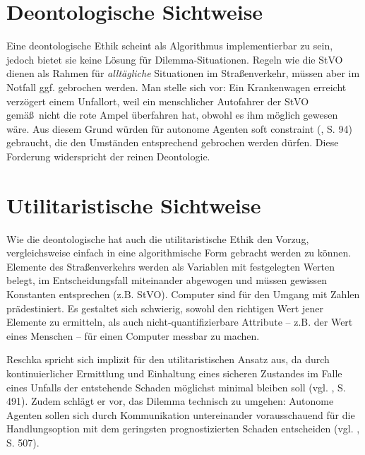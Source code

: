 \documentclass[a4paper, 12pt, titlepage]{scrartcl}
\begin{document}
\section{Deontologische Sichtweise}
	Eine deontologische Ethik scheint als Algorithmus implementierbar zu sein, jedoch bietet sie keine L\"osung f\"ur Dilemma-Situationen. Regeln wie die StVO dienen als Rahmen f\"ur \emph{allt\"agliche} Situationen im Stra\ss enverkehr, m\"ussen aber im Notfall ggf. gebrochen werden. Man stelle sich vor: Ein Krankenwagen erreicht verz\"ogert einem Unfallort, weil ein menschlicher Autofahrer der StVO gem\"a\ss\ nicht die rote Ampel \"uberfahren hat, obwohl es ihm m\"oglich gewesen w\"are. Aus diesem Grund w\"urden f\"ur autonome Agenten \glqq soft constraint\grqq{} (\autocite{Gerdes2015}, S. 94) gebraucht, die den Umst\"anden entsprechend gebrochen werden d\"urfen. Diese Forderung widerspricht der reinen Deontologie. 
\section{Utilitaristische Sichtweise}
	Wie die deontologische hat auch die utilitaristische Ethik den Vorzug, vergleichsweise einfach in eine algorithmische Form gebracht werden zu k\"onnen. Elemente des Stra\ss enverkehrs werden als Variablen mit festgelegten Werten belegt, im Entscheidungsfall miteinander abgewogen und m\"ussen gewissen Konstanten entsprechen (z.B. StVO). Computer sind f\"ur den Umgang mit Zahlen pr\"adestiniert. Es gestaltet sich schwierig, sowohl den richtigen Wert jener Elemente zu ermitteln, als auch nicht-quantifizierbare Attribute -- z.B. der Wert eines Menschen -- f\"ur einen Computer messbar zu machen. 

	Reschka \autocite{Reschka2015} spricht sich implizit f\"ur den utilitaristischen Ansatz aus, da durch kontinuierlicher Ermittlung und Einhaltung eines sicheren Zustandes im Falle eines Unfalls der entstehende Schaden m\"oglichst minimal bleiben soll (vgl. \autocite{Reschka2015}, S. 491). Zudem schl\"agt er vor, das Dilemma technisch zu umgehen: Autonome Agenten sollen sich durch Kommunikation untereinander vorausschauend f\"ur die Handlungsoption mit dem geringsten prognostizierten Schaden entscheiden (vgl. \autocite{Reschka2015}, S. 507).
	
\end{document}
